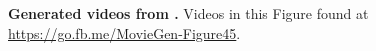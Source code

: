 
\begin{center}
    \centering
    \captionsetup{type=figure}
    
    \vspace{-3mm}
    \caption{\textbf{Generated videos from \OursVideo.} 
    Videos in this Figure found at \url{https://go.fb.me/MovieGen-Figure45}.}
    \label{fig:t2v_qual_ours_figure_app1}
\end{center}%
